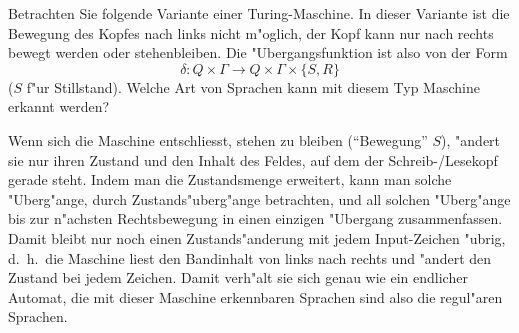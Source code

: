 Betrachten Sie folgende Variante einer Turing-Maschine. In dieser
Variante ist die Bewegung des Kopfes nach links nicht m"oglich,
der Kopf kann nur nach rechts bewegt werden oder stehenbleiben. Die
"Ubergangsfunktion ist also von der Form
$$\delta:Q\times \Gamma\to Q\times\Gamma\times \{S,R\}$$
($S$ f"ur Stillstand). Welche Art von Sprachen kann mit diesem
Typ Maschine erkannt werden?

\begin{loesung}
Wenn sich die Maschine entschliesst, stehen zu bleiben (``Bewegung'' $S$),
"andert sie
nur ihren Zustand und den Inhalt des Feldes, auf dem der Schreib-/Lesekopf
gerade steht. Indem man die Zustandsmenge erweitert, kann man solche
"Uberg"ange, durch Zustands"uberg"ange betrachten, und all solchen "Uberg"ange
bis zur n"achsten Rechtsbewegung in einen einzigen "Ubergang zusammenfassen.
Damit bleibt nur noch einen Zustands"anderung mit jedem Input-Zeichen
"ubrig, d.~h.~die Maschine liest den Bandinhalt von links nach rechts und
"andert den Zustand bei jedem Zeichen. Damit verh"alt sie sich genau
wie ein endlicher Automat, die mit dieser Maschine erkennbaren Sprachen
sind also die regul"aren Sprachen.
\end{loesung}
